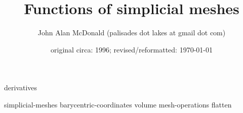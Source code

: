 \documentclass{PalisadesLakesReport}
\title{Functions of simplicial meshes}
\author{John Alan McDonald (palisades dot lakes at gmail dot com)}
\date{original circa: 1996; revised/reformatted: \today}
\begin{document}
\maketitle
\PalisadesLakesTableOfContents
\def\sharedFolder{../../shared/}





{derivatives}


{simplicial-meshes}
{barycentric-coordinates}
{volume}
{mesh-operations}
{flatten}



\end{document}
